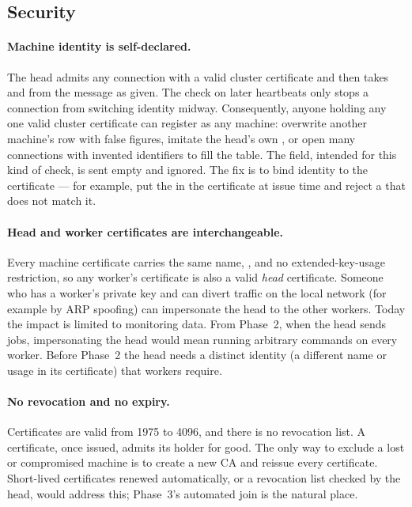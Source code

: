\documentclass{article}
\begin{document}
\subsection{Security}
\label{sec:lim-security}

\paragraph{Machine identity is self-declared.}
The head admits any connection with a valid cluster certificate and then
takes  and  from the  message
as given. The check on later heartbeats only stops a connection from
switching identity midway. Consequently, anyone holding any one valid
cluster certificate can register as any machine: overwrite another
machine's row with false figures, imitate the head's own
, or open many connections with invented identifiers to
fill the table. The  field, intended for this kind
of check, is sent empty and ignored. The fix is to bind identity to the
certificate --- for example, put the  in the certificate at
issue time and reject a  that does not match it.

\paragraph{Head and worker certificates are interchangeable.}
Every machine certificate carries the same name, ,
and no extended-key-usage restriction, so any worker's certificate is
also a valid \emph{head} certificate. Someone who has a worker's private
key and can divert traffic on the local network (for example by ARP
spoofing) can impersonate the head to the other workers. Today the impact
is limited to monitoring data. From Phase~2, when the head sends jobs,
impersonating the head would mean running arbitrary commands on every
worker. Before Phase~2 the head needs a distinct identity (a different
name or usage in its certificate) that workers require.

\paragraph{No revocation and no expiry.}
Certificates are valid from 1975 to 4096, and there is no revocation list.
A certificate, once issued, admits its holder for good. The only way to
exclude a lost or compromised machine is to create a new CA and reissue
every certificate. Short-lived certificates renewed automatically, or a
revocation list checked by the head, would address this; Phase~3's
automated join is the natural place.
\end{document}
